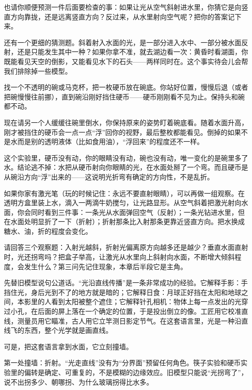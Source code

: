 也请你顺便预测一件后面要检查的事：如果让光从空气斜射进水里，你猜它是向竖直方向靠拢，还是远离竖直方向？反过来，从水里射向空气呢？把你的答案记下来。

还有一个更细的猜测题。斜着射入水面的光，是一部分进入水中、一部分被水面反射，还是只能发生其中一种？如果你拿不准，就去湖边看一次：黄昏时看湖面，你既能看见天空的倒影，又能看见水下的石头——两样同时在。这个事实待会儿会帮我们排除掉一些模型。


\begin{experiment}[消失的硬币]
找一个不透明的碗或马克杯，把一枚硬币放在碗底。你站好位置，慢慢后退（或者把碗慢慢往前挪），直到碗沿刚好挡住硬币——硬币刚刚看不见为止。保持头和碗都不动。

现在请另一个人缓缓往碗里倒水，你保持原来的姿势盯着碗底看。随着水面升高，刚才被挡住的硬币会一点一点“浮”回你的视野，最后整枚都能看见。倒掉的如果不是水而是别的透明液体（比如食用油），“浮回来”的程度还不一样。
\end{experiment}

这个实验里，硬币没有动，你的眼睛没有动，碗也没有动，唯一变化的是碗里多了水。结论逃不掉：水把从硬币射向你眼睛的光，在水面处掰了一个弯。而且硬币是从碗沿方向“浮”出来的——这说明光折弯有确定的方向性，不是乱折。

如果你家有激光笔（玩的时候记住：永远不要直射眼睛），可以再做一组观察。在透明方盒里装上水，滴入一两滴牛奶搅匀，让光路显形。从空气斜着把激光射向水面，你会同时看到三件事：一条光从水面弹回空气（反射）；一条光钻进水里，但在水面处明显折了一下（折射）；折射那条比入射那条更靠近竖直方向。把水换成糖水、油，折的程度会变化。

请回答三个观察题：入射光越斜，折射光偏离原方向越多还是越少？垂直水面直射时，光还拐弯吗？把盒子举高，让激光从水里向上斜射向水面，不断增大倾斜程度，会发生什么？第三问先记住现象，本章后半段它是主角。


先替旧模型说句公道话。“光沿直线传播”是一条非常成功的经验。它解释手影：手挡住光，身后光到不了的地方就是暗的；它解释日食：月球正好挡在太阳和地球之间，本影里的人看到太阳被整个遮住；它解释针孔相机：物体上每一点发出的光穿过小孔，在后面的屏上落在一个确定的位置，于是投出倒立的像。工匠用它校准直线，测量员用它瞄准，古人用它立竿测日影定节气。在这套语言里，光是一种沿直线飞的东西，整个光学就是画直线。

可是，把这套语言拿到水面，它立刻撞墙。

第一处撞墙：折射。“光走直线”没有为“分界面”预留任何角色。筷子实验和硬币实验里的偏转是确定、可重复的，不是模糊的边缘效应。旧模型只能说“光拐弯了”，说不出拐多少、朝哪拐、为什么玻璃拐得比水多。

